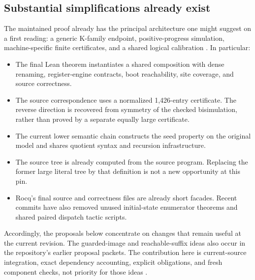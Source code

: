 \documentclass[11pt,a4paper]{article}
\theoremstyle{remark}
\begin{document}
\subsection{Substantial simplifications already exist}
The maintained proof already has the principal architecture one might suggest
on a first reading: a generic K-family endpoint, positive-progress simulation,
machine-specific finite certificates, and a shared logical calibration
\cite{endpoint,ksim,history}. In particular:
\begin{itemize}
\item The final Lean theorem instantiates a shared composition with dense
renaming, register-engine contracts, boot reachability, site coverage, and
source correctness.
\item The source correspondence uses a normalized 1,426-entry certificate.
The reverse direction is recovered from symmetry of the checked bisimulation,
rather than
proved by a separate equally large certificate.
\item The current lower semantic chain constructs the seed property on the
original model and shares quotient syntax and recursion infrastructure.
\item The source tree is already computed from the source program.
Replacing the former large literal tree by that definition is not a new
opportunity at this pin.
\item Rocq's final source and correctness files are already short facades.
Recent commits have also removed unused initial-state enumerator theorems and
shared paired dispatch tactic scripts.
\end{itemize}
Accordingly, the proposals below concentrate on changes that remain useful at
the current revision. The guarded-image and reachable-suffix ideas also occur
in the repository's earlier proposal packets. The contribution here is
current-source integration, exact dependency accounting, explicit obligations,
and fresh component checks, not priority for those ideas
\cite{native-prior,collection-prior,further-prior,proof-core-prior}.
\end{document}
